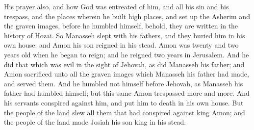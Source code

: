 His prayer also, and how God was entreated of him, and all his sin and his trespass, and the places wherein he built high places, and set up the Asherim and the graven images, before he humbled himself, behold, they are written in the history of Hozai. So Manasseh slept with his fathers, and they buried him in his own house: and Amon his son reigned in his stead.  Amon was twenty and two years old when he began to reign; and he reigned two years in Jerusalem. And he did that which was evil in the sight of Jehovah, as did Manasseh his father; and Amon sacrificed unto all the graven images which Manasseh his father had made, and served them. And he humbled not himself before Jehovah, as Manasseh his father had humbled himself; but this same Amon trespassed more and more. And his servants conspired against him, and put him to death in his own house. But the people of the land slew all them that had conspired against king Amon; and the people of the land made Josiah his son king in his stead. 

